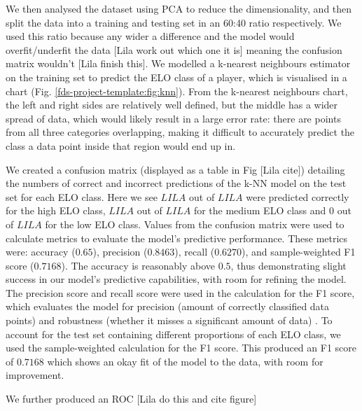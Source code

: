\documentclass[10pt,a4paper,twocolumn]{article}
\begin{document}
We then analysed the dataset using PCA to reduce the dimensionality, and then split the data into a training and testing set in an 60:40 ratio respectively. We used this ratio because any wider a difference and the model would overfit/underfit the data [Lila work out which one it is] meaning the confusion matrix wouldn't [Lila finish this]. We modelled a k-nearest neighbours estimator on the training set to predict the ELO class of a player, which is visualised in a chart (Fig. \ref{fds-project-template:fig:knn}). From the k-nearest neighbours chart, the left and right sides are relatively well defined, but the middle has a wider spread of data, which would likely result in a large error rate: there are points from all three categories overlapping, making it difficult to accurately predict the class a data point inside that region would end up in. \newline

We created a confusion matrix (displayed as a table in Fig [Lila cite]) detailing the numbers of correct and incorrect predictions of the k-NN model on the test set for each ELO class. Here we see $ LILA $ out of $LILA$ were predicted correctly for the high ELO class, $LILA$ out of $LILA$ for the medium ELO class and $0$ out of $LILA$ for the low ELO class. Values from the confusion matrix were used to calculate metrics to evaluate the model's predictive performance. These metrics were: accuracy ($0.65$), precision ($0.8463$), recall ($0.6270$), and sample-weighted F1 score ($0.7168$). The accuracy is reasonably above $0.5$, thus demonstrating slight success in our model's predictive capabilities, with room for refining the model. The precision score and recall score were used in the calculation for the F1 score, which evaluates the model for precision (amount of correctly classified data points) and robustness (whether it misses a significant amount of data) \cite{MetricsToEvaluateYourML}. To account for the test set containing different proportions of each ELO class, we used the sample-weighted calculation for the F1 score. This produced an F1 score of $0.7168$ which shows an okay fit of the model to the data, with room for improvement. \newline

We further produced an ROC [Lila do this and cite figure]
\end{document}

